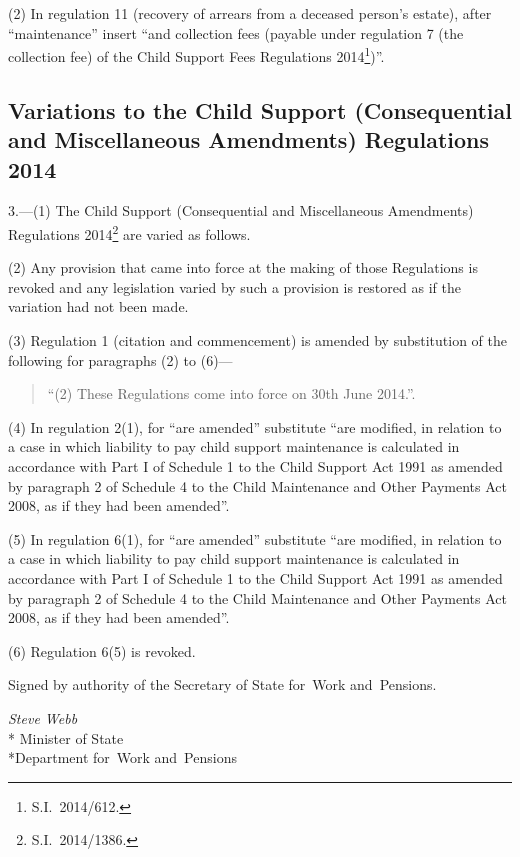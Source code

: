 \documentclass[12pt,a4paper]{article}
\begin{document}
(2) In regulation 11 (recovery of arrears from a deceased person’s estate), after “maintenance” insert “and collection fees (payable under regulation 7 (the collection fee) of the Child Support Fees Regulations 2014\footnote{S.I.~2014/612.})”.

\subsection[3. Variations to the Child Support (Consequential and Miscellaneous Amendments) Regulations 2014]{Variations to the Child Support (Consequential and Miscellaneous Amendments) Regulations 2014}

3.—(1) The Child Support (Consequential and Miscellaneous Amendments) Regulations 2014\footnote{S.I.~2014/1386.} are varied as follows.

(2) Any provision that came into force at the making of those Regulations is revoked and any legislation varied by such a provision is restored as if the variation had not been made.

(3) Regulation 1 (citation and commencement) is amended by substitution of the following for paragraphs (2) to (6)—
\begin{quotation}
“(2) These Regulations come into force on 30th June 2014.”.
\end{quotation}

(4) In regulation 2(1), for “are amended” substitute “are modified, in relation to a case in which liability to pay child support maintenance is calculated in accordance with Part I of Schedule 1 to the Child Support Act 1991 as amended by paragraph 2 of Schedule 4 to the Child Maintenance and Other Payments Act 2008, as if they had been amended”.

(5) In regulation 6(1), for “are amended” substitute “are modified, in relation to a case in which liability to pay child support maintenance is calculated in accordance with Part I of Schedule 1 to the Child Support Act 1991 as amended by paragraph 2 of Schedule 4 to the Child Maintenance and Other Payments Act 2008, as if they had been amended”.

(6) Regulation 6(5) is revoked. 

\bigskip

\pagebreak[3]

Signed 
by authority of the 
Secretary of State for~Work and~Pensions.

{\raggedleft
\emph{Steve Webb}\\*
Minister
of State\\*Department 
for~Work and~Pensions

}
\end{document}
